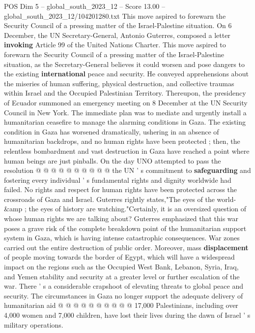 \begin{textsample}{POS Dim 5 – global\_south\_2023\_12 – Score 13.00 – global\_south\_2023\_12/104201280.txt}  \label{ex:f5_pos_220}
This move aspired to forewarn the Security Council of a pressing matter of the Israel-Palestine situation.
On 6 December, the UN Secretary-General, Antonio Guterres, composed a letter \textbf{invoking} Article 99 of the United Nations Charter.
This move aspired to forewarn the Security Council of a pressing matter of the Israel-Palestine situation, as the Secretary-General believes it could worsen and pose dangers to the existing \textbf{international} peace and security.
He conveyed apprehensions about the miseries of human suffering, physical destruction, and collective traumas within Israel and the Occupied Palestinian Territory.
Thereupon, the presidency of Ecuador summoned an emergency meeting on 8 December at the UN Security Council in New York.
The immediate plan was to mediate and urgently install a humanitarian ceasefire to manage the alarming conditions in Gaza.
The existing condition in Gaza has worsened dramatically, ushering in an absence of humanitarian backdrops, and no human rights have been protected ; then, the relentless bombardment and vast destruction in Gaza have reached a point where human beings are just pinballs.
On the day UNO attempted to pass the resolution @ @ @ @ @ @ @ @ @ @ the UN ' s commitment to \textbf{safeguarding} and fostering every individual ' s fundamental rights and dignity worldwide had failed.
No rights and respect for human rights have been protected across the crossroads of Gaza and Israel.
Guterres rightly states,"The eyes of the world-\&amp ; the eyes of history are watching."Certainly, it is an oversized question of whose human rights we are talking about?
Guterres emphasized that this war poses a grave risk of the complete breakdown point of the humanitarian support system in Gaza, which is having intense catastrophic consequences.
War zones carried out the entire destruction of public order.
Moreover, mass \textbf{displacement} of people moving towards the border of Egypt, which will have a widespread impact on the regions such as the Occupied West Bank, Lebanon, Syria, Iraq, and Yemen stability and security at a greater level or further escalation of the war.
There ' s a considerable crapshoot of elevating threats to global peace and security.
The circumstances in Gaza no longer support the adequate delivery of humanitarian aid @ @ @ @ @ @ @ @ @ @ 17,000 Palestinians, including over 4,000 women and 7,000 children, have lost their lives during the dawn of Israel ' s military operations.

\end{textsample}
